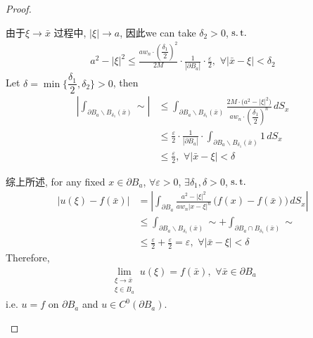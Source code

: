 \begin{thm}
\begin{proof}
\begin{enumerate}
\begin{enumerate}
					\newpage
					
					由于$\xi \to \bar{x}$ 过程中, $| \xi | \to a$, 因此we can take $\delta_2 > 0$, $\operatorname{s.t.}$ 
					\begin{align*}
						a^2 - | \xi |^2 
						\leq \frac{a w_n \cdot \left( \dfrac{\delta_1}{2} \right)^2}{2M} \cdot \frac{1}{| \partial B_a |} \cdot \frac{\varepsilon}{2} , \,\, \forall | \bar{x} - \xi | < \delta_2
					\end{align*}
					Let $\delta = \min \{ \dfrac{\delta_1}{2} , \delta_2 \} > 0$, then
					\begin{align*}
						\left| \int_{\partial B_a \backslash B_{\delta_1}(\bar{x})} \sim \right| 
						&\leq \int_{\partial B_a \backslash B_{\delta_1}(\bar{x})} \frac{2M \cdot \Big( a^2 - | \xi |^2 \Big) }{a w_n \cdot \left( \dfrac{\delta_1}{2} \right)^n} \, dS_x \\
						&\leq \frac{\varepsilon}{2} \cdot \frac{1}{| \partial B_a |} \cdot \int_{\partial B_a \backslash B_{\delta_1}(\bar{x})} 1 \, dS_x \\
						&\leq \frac{\varepsilon}{2} , \,\, \forall | \bar{x} - \xi | < \delta
					\end{align*}
				\end{enumerate}
				
				\vspace*{2em}
				
				\hspace{-1.95em}综上所述, for any fixed $x \in \partial B_a$, $\forall \varepsilon > 0$, $\exists \delta_1 , \delta > 0$, $\operatorname{s.t.}$
				\begin{align*}
					\left| u(\xi) - f(\bar{x}) \right| 
					&= \left| \int_{\partial B_a} \frac{a^2 - | \xi |^2}{a w_n | x - \xi |^n} \, \Big( f(x) - f(\bar{x}) \Big) \, dS_x \right| \\
					&\leq \int_{\partial B_a \backslash B_{\delta_1}(\bar{x})} \sim + \int_{\partial B_a \cap B_{\delta_1}(\bar{x})} \sim \\
					&\leq \frac{\varepsilon}{2} + \frac{\varepsilon}{2} 
					= \varepsilon , \,\, \forall | \bar{x} - \xi | < \delta
				\end{align*}
				Therefore, 
				\begin{align*}
					\lim_{\substack{\xi \to \bar{x} \\ \xi \in B_a}} u(\xi) = f(\bar{x}) , \,\, \forall \bar{x} \in \partial B_a
				\end{align*}
				i.e. $u = f$ on $\partial B_a$ and $u \in C^0\left( \partial B_a \right)$. 
			\end{enumerate}
		\end{proof}
	\end{thm}















	\ifx\allfiles\undefined

\fi